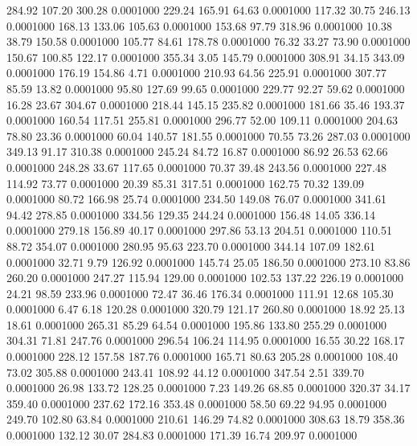  284.92  107.20  300.28   0.0001000
 229.24  165.91   64.63   0.0001000
 117.32   30.75  246.13   0.0001000
 168.13  133.06  105.63   0.0001000
 153.68   97.79  318.96   0.0001000
  10.38   38.79  150.58   0.0001000
 105.77   84.61  178.78   0.0001000
  76.32   33.27   73.90   0.0001000
 150.67  100.85  122.17   0.0001000
 355.34    3.05  145.79   0.0001000
 308.91   34.15  343.09   0.0001000
 176.19  154.86    4.71   0.0001000
 210.93   64.56  225.91   0.0001000
 307.77   85.59   13.82   0.0001000
  95.80  127.69   99.65   0.0001000
 229.77   92.27   59.62   0.0001000
  16.28   23.67  304.67   0.0001000
 218.44  145.15  235.82   0.0001000
 181.66   35.46  193.37   0.0001000
 160.54  117.51  255.81   0.0001000
 296.77   52.00  109.11   0.0001000
 204.63   78.80   23.36   0.0001000
  60.04  140.57  181.55   0.0001000
  70.55   73.26  287.03   0.0001000
 349.13   91.17  310.38   0.0001000
 245.24   84.72   16.87   0.0001000
  86.92   26.53   62.66   0.0001000
 248.28   33.67  117.65   0.0001000
  70.37   39.48  243.56   0.0001000
 227.48  114.92   73.77   0.0001000
  20.39   85.31  317.51   0.0001000
 162.75   70.32  139.09   0.0001000
  80.72  166.98   25.74   0.0001000
 234.50  149.08   76.07   0.0001000
 341.61   94.42  278.85   0.0001000
 334.56  129.35  244.24   0.0001000
 156.48   14.05  336.14   0.0001000
 279.18  156.89   40.17   0.0001000
 297.86   53.13  204.51   0.0001000
 110.51   88.72  354.07   0.0001000
 280.95   95.63  223.70   0.0001000
 344.14  107.09  182.61   0.0001000
  32.71    9.79  126.92   0.0001000
 145.74   25.05  186.50   0.0001000
 273.10   83.86  260.20   0.0001000
 247.27  115.94  129.00   0.0001000
 102.53  137.22  226.19   0.0001000
  24.21   98.59  233.96   0.0001000
  72.47   36.46  176.34   0.0001000
 111.91   12.68  105.30   0.0001000
   6.47    6.18  120.28   0.0001000
 320.79  121.17  260.80   0.0001000
  18.92   25.13   18.61   0.0001000
 265.31   85.29   64.54   0.0001000
 195.86  133.80  255.29   0.0001000
 304.31   71.81  247.76   0.0001000
 296.54  106.24  114.95   0.0001000
  16.55   30.22  168.17   0.0001000
 228.12  157.58  187.76   0.0001000
 165.71   80.63  205.28   0.0001000
 108.40   73.02  305.88   0.0001000
 243.41  108.92   44.12   0.0001000
 347.54    2.51  339.70   0.0001000
  26.98  133.72  128.25   0.0001000
   7.23  149.26   68.85   0.0001000
 320.37   34.17  359.40   0.0001000
 237.62  172.16  353.48   0.0001000
  58.50   69.22   94.95   0.0001000
 249.70  102.80   63.84   0.0001000
 210.61  146.29   74.82   0.0001000
 308.63   18.79  358.36   0.0001000
 132.12   30.07  284.83   0.0001000
 171.39   16.74  209.97   0.0001000
